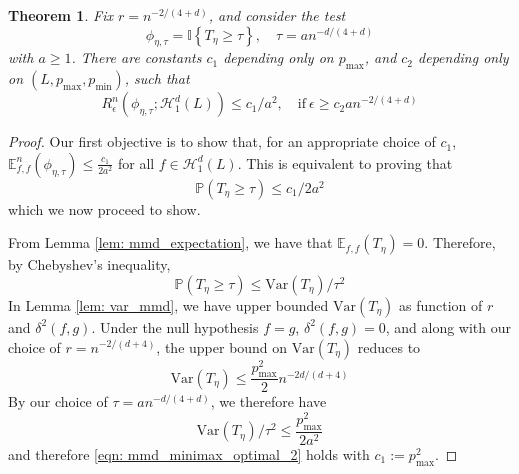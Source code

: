 \documentclass{article}
\newcommand{\Var}{\mathrm{Var}}
\newcommand{\1}{\mathbb{I}}
\newcommand{\Pbb}{\mathbb{P}}
\newcommand{\Ebb}{\mathbb{E}}
\theoremstyle{alden}
\theoremstyle{aldenthm}
\newtheorem{theorem}{Theorem}
\theoremstyle{definition}
\theoremstyle{remark}
\begin{document}
\begin{theorem}
	\label{thm: mmd_minimax_optimal}
	Fix $r = n^{-2/(4+d)}$, and consider the test 
	\begin{equation*}
	\phi_{\eta,\tau} = \1\left\{ T_{\eta} \geq \tau \right\}, \quad \tau = a n^{-d/(4+d)}
	\end{equation*}
	with $a \geq 1$. There are constants $c_1$ depending only on $p_{\max}$, and $c_2$ depending only on $(L,p_{\max},p_{\min})$, such that
	\begin{equation*}
	R_{\epsilon}^{n}(\phi_{\eta,\tau}; \mathcal{H}_{1}^{d}(L)) \leq c_1/a^2, \quad \text{if}~ \epsilon \geq c_2 a n^{-2/(4 + d)}
	\end{equation*}
\end{theorem}
\begin{proof}
	Our first objective is to show that, for an appropriate choice of $c_1$, $\Ebb_{f,f}^{n}(\phi_{\eta,\tau}) \leq \frac{c_1}{2a^2}$ for all $f \in \mathcal{H}_{1}^{d}(L)$. This is equivalent to proving that
	\begin{equation}
	\label{eqn: mmd_minimax_optimal_2}
	\Pbb \left(T_{\eta} \geq \tau \right) \leq c_1/2a^2
	\end{equation}
	which we now proceed to show.
	
	From Lemma \ref{lem: mmd_expectation}, we have that $\Ebb_{f,f}(T_{\eta}) = 0$. Therefore, by Chebyshev's inequality, 
	\begin{equation}
	\label{eqn: mmd_minimax_optimal_1}
	\Pbb \left(T_{\eta} \geq \tau \right) \leq \Var(T_{\eta})/\tau^2
	\end{equation}
	In Lemma \ref{lem: var_mmd}, we have upper bounded $\Var(T_{\eta})$ as function of $r$ and $\delta^2(f,g)$. Under the null hypothesis $f = g$, $\delta^2(f,g) = 0$, and along with our choice of $r = n^{-2/(d + 4)}$, the upper bound on $\Var(T_{\eta})$ reduces to
	\begin{equation*}
	\Var(T_{\eta}) \leq \frac{p_{\max}^2}{2} n^{-2d/(d + 4)}
	\end{equation*}
	By our choice of $\tau = a n^{-d/(4 + d)}$, we therefore have
	\begin{equation*}
	\Var(T_{\eta})/\tau^2 \leq \frac{p_{\max}^2}{2a^2}
	\end{equation*}
	and therefore \eqref{eqn: mmd_minimax_optimal_2} holds with $c_1 := p_{\max}^2$.
	

\end{proof}
\end{document}
